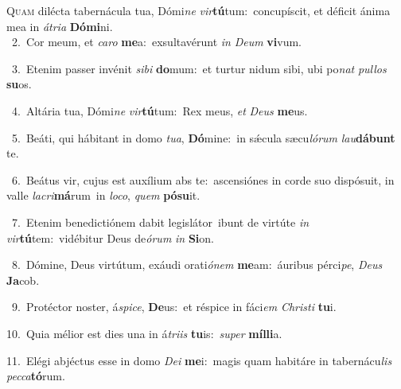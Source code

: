 \lettrine{\initial\textcolor{\initialcolor}{Q}}{uam} dilécta tabernácula tua, Dómi\textit{ne} \textit{vir}\-\textbf{tú}tum:~\star concupíscit, et déficit ánima mea in \textit{á}\-\textit{tri}\textit{a} \textbf{Dó}\-\textbf{mi}ni.\\
{\numbfont\textcolor{\numbcolor}{~2.}}~Cor meum, et \textit{ca}\-\textit{ro} \textbf{me}\-a:~\star exsultavérunt \textit{in} \textit{De}\-\textit{um} \textbf{vi}\-vum.\par
{\numbfont\textcolor{\numbcolor}{~3.}}~Etenim passer invénit \textit{si}\-\textit{bi} \textbf{do}\-mum:~\star et turtur nidum sibi, ubi po\textit{nat} \textit{pul}\-\textit{los} \textbf{su}\-os.\par
{\numbfont\textcolor{\numbcolor}{~4.}}~Altária tua, Dómi\textit{ne} \textit{vir}\-\textbf{tú}tum:~\star Rex meus, \textit{et} \textit{De}\-\textit{us} \textbf{me}\-us.\par
{\numbfont\textcolor{\numbcolor}{~5.}}~Beáti, qui hábitant in domo \textit{tu}\-\textit{a}, \textbf{Dó}\-mine:~\star in sǽcula sæcu\-\textit{ló}\-\textit{rum} \textit{lau}\-\textbf{dá}\textbf{bunt} te.\par
{\numbfont\textcolor{\numbcolor}{~6.}}~Beátus vir, cujus est auxílium abs te:~\dagger ascensiónes in corde suo dispósuit, in valle \textit{la}\-\textit{cri}\textbf{má}rum~\star in \textit{lo}\-\textit{co}, \textit{quem} \textbf{pó}\-\textbf{su}it.\par
{\numbfont\textcolor{\numbcolor}{~7.}}~Etenim benedictiónem dabit legislátor~\dagger ibunt de virtúte \textit{in} \textit{vir}\-\textbf{tú}tem:~\star vidébitur Deus de\-\textit{ó}\-\textit{rum} \textit{in} \textbf{Si}\-on.\par
{\numbfont\textcolor{\numbcolor}{~8.}}~Dómine, Deus virtútum, exáudi orati\-\textit{ó}\-\textit{nem} \textbf{me}\-am:~\star áuribus pérci\-\textit{pe}\-, \textit{De}\-\textit{us} \textbf{Ja}\-cob.\par
{\numbfont\textcolor{\numbcolor}{~9.}}~Protéctor noster, á\-\textit{spi}\-\textit{ce}, \textbf{De}\-us:~\star et réspice in fáci\textit{em} \textit{Chris}\-\textit{ti} \textbf{tu}\-i.\par
{\numbfont\textcolor{\numbcolor}{10.}}~Quia mélior est dies una in á\-\textit{tri}\-\textit{is} \textbf{tu}\-is:~\star \textit{su}\-\textit{per} \textbf{míl}\-\textbf{li}a.\par
{\numbfont\textcolor{\numbcolor}{11.}}~Elégi abjéctus esse in domo \textit{De}\-\textit{i} \textbf{me}\-i:~\star magis quam habitáre in tabernácu\textit{lis} \textit{pec}\-\textit{ca}\textbf{tó}rum.\par
